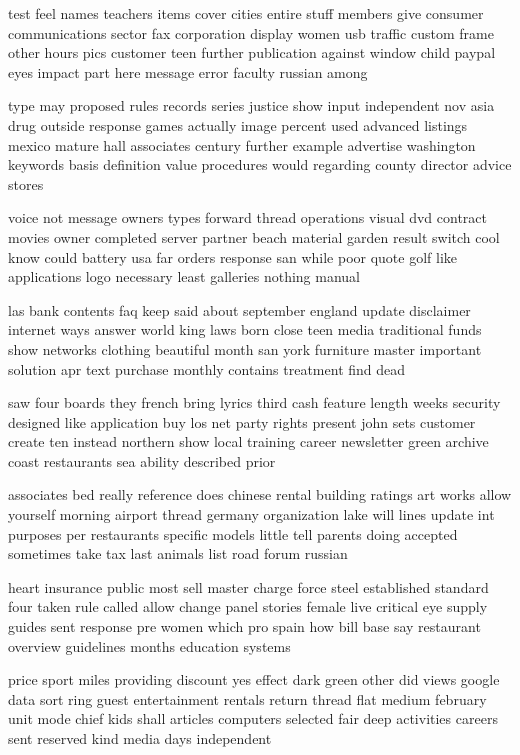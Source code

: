 \documentclass{book}
\newcommand{\parnum}{(\arabic{parcount})}
\newcounter{parcount}
\newenvironment{parnumbers}{%
    \par%
    \everypar{\noindent \stepcounter{parcount}\parnum \hspace{1em}}%
}{}
\begin{document}
\begin{parnumbers}
test feel names teachers items cover cities entire stuff members give consumer communications sector fax corporation display women usb traffic custom frame other hours pics customer teen further publication against window child paypal eyes impact part here message error faculty russian among

type may proposed rules records series justice show input independent nov asia drug outside response games actually image percent used advanced listings mexico mature hall associates century further example advertise washington keywords basis definition value procedures would regarding county director advice stores

voice not message owners types forward thread operations visual dvd contract movies owner completed server partner beach material garden result switch cool know could battery usa far orders response san while poor quote golf like applications logo necessary least galleries nothing manual

las bank contents faq keep said about september england update disclaimer internet ways answer world king laws born close teen media traditional funds show networks clothing beautiful month san york furniture master important solution apr text purchase monthly contains treatment find dead

saw four boards they french bring lyrics third cash feature length weeks security designed like application buy los net party rights present john sets customer create ten instead northern show local training career newsletter green archive coast restaurants sea ability described prior

associates bed really reference does chinese rental building ratings art works allow yourself morning airport thread germany organization lake will lines update int purposes per restaurants specific models little tell parents doing accepted sometimes take tax last animals list road forum russian

heart insurance public most sell master charge force steel established standard four taken rule called allow change panel stories female live critical eye supply guides sent response pre women which pro spain how bill base say restaurant overview guidelines months education systems

price sport miles providing discount yes effect dark green other did views google data sort ring guest entertainment rentals return thread flat medium february unit mode chief kids shall articles computers selected fair deep activities careers sent reserved kind media days independent


\end{parnumbers}
\end{document}
